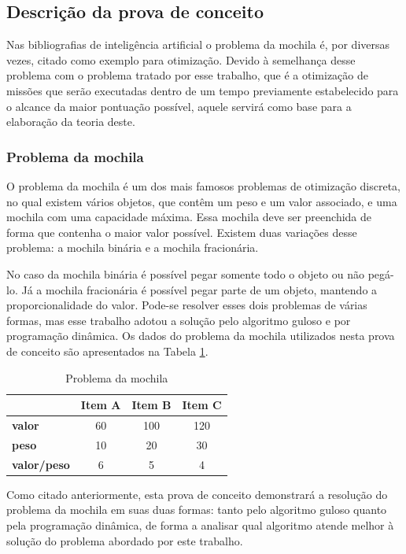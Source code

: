 \subsection{Descrição da prova de conceito}
Nas bibliografias de inteligência artificial o problema da mochila é, por diversas vezes, citado como exemplo para otimização. Devido à semelhança desse problema com o problema tratado por esse trabalho, que é a otimização de missões que serão executadas dentro de um tempo previamente estabelecido para o alcance da maior pontuação possível, aquele servirá como base para a elaboração da teoria deste.
 
\subsubsection{Problema da mochila} \label{ProblemaDaMochila}
O problema da mochila é um dos mais famosos problemas de otimização discreta, no qual existem vários objetos, que contêm um peso e um valor associado, e uma mochila com uma capacidade máxima. Essa mochila deve ser preenchida de forma que contenha o maior valor possível. Existem duas variações desse problema: a mochila binária e a mochila fracionária.

No caso da mochila binária é possível pegar somente todo o objeto ou não pegá-lo. Já a mochila fracionária é possível pegar parte de um objeto, mantendo a proporcionalidade do valor. Pode-se resolver esses dois problemas de várias formas, mas esse trabalho adotou a solução pelo algoritmo guloso e por programação dinâmica. Os dados do problema da mochila utilizados nesta prova de conceito são apresentados na Tabela \ref{knapsack}.

\FloatBarrier
\begin{table}[!h]
	\centering	
	\begin{tabular}{lccc}
		\toprule
		& \textbf{Item A} & \textbf{Item B} & \textbf{Item C} \\
		\midrule
		\textbf{valor} & 60 & 100 & 120 \\
		\midrule
		\textbf{peso} & 10 & 20 & 30 \\
		\midrule
		\textbf{valor/peso} & 6 & 5 & 4 \\
		\bottomrule
	\end{tabular}
	\caption{Problema da mochila}
	\label{knapsack}
\end{table}

Como citado anteriormente, esta prova de conceito demonstrará a resolução do problema da mochila em suas duas formas: tanto pelo algoritmo guloso quanto pela programação dinâmica, de forma a analisar qual algoritmo atende melhor à solução do problema abordado por este trabalho. 

